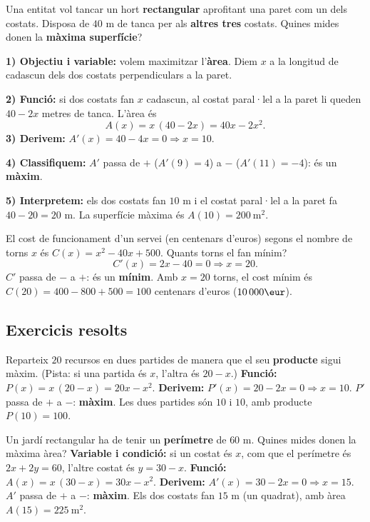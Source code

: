 \begin{exemple}
Una entitat vol tancar un hort \textbf{rectangular} aprofitant una paret com un dels
costats. Disposa de $40$ m de tanca per als \textbf{altres tres} costats. Quines mides
donen la \textbf{màxima superfície}?

\medskip
\noindent\textbf{1) Objectiu i variable:} volem maximitzar l'\textbf{àrea}. Diem $x$ a
la longitud de cadascun dels dos costats perpendiculars a la paret.

\noindent\textbf{2) Funció:} si dos costats fan $x$ cadascun, al costat paral·lel a la
paret li queden $40-2x$ metres de tanca. L'àrea és
\[
A(x)=x\,(40-2x)=40x-2x^2.
\]
\noindent\textbf{3) Derivem:} $A'(x)=40-4x=0 \Rightarrow x=10$.

\noindent\textbf{4) Classifiquem:} $A'$ passa de $+$ ($A'(9)=4$) a $-$ ($A'(11)=-4$):
és un \textbf{màxim}.

\noindent\textbf{5) Interpretem:} els dos costats fan $10$ m i el costat paral·lel a la
paret fa $40-20=20$ m. La superfície màxima és $A(10)=200\ \text{m}^2$.
\end{exemple}

\begin{exemple}
El cost de funcionament d'un servei (en centenars d'euros) segons el nombre de torns
$x$ és $C(x)=x^2-40x+500$. Quants torns el fan mínim?
\[
C'(x)=2x-40=0 \Rightarrow x=20.
\]
$C'$ passa de $-$ a $+$: és un \textbf{mínim}. Amb $x=20$ torns, el cost mínim és
$C(20)=400-800+500=100$ centenars d'euros ($10\,000\eur$).
\end{exemple}

\subsection{Exercicis resolts}

\begin{exresolt}
Reparteix $20$ recursos en dues partides de manera que el seu \textbf{producte} sigui
màxim. (Pista: si una partida és $x$, l'altra és $20-x$.)
\solucio
\textbf{Funció:} $P(x)=x\,(20-x)=20x-x^2$. \quad \textbf{Derivem:}
$P'(x)=20-2x=0\Rightarrow x=10$. $P'$ passa de $+$ a $-$: \textbf{màxim}. Les dues
partides són $10$ i $10$, amb producte $P(10)=100$.
\end{exresolt}

\begin{exresolt}
Un jardí rectangular ha de tenir un \textbf{perímetre} de $60$ m. Quines mides donen la
màxima àrea?
\solucio
\textbf{Variable i condició:} si un costat és $x$, com que el perímetre és
$2x+2y=60$, l'altre costat és $y=30-x$.
\textbf{Funció:} $A(x)=x\,(30-x)=30x-x^2$. \quad \textbf{Derivem:}
$A'(x)=30-2x=0\Rightarrow x=15$. $A'$ passa de $+$ a $-$: \textbf{màxim}. Els dos costats
fan $15$ m (un quadrat), amb àrea $A(15)=225\ \text{m}^2$.
\end{exresolt}

